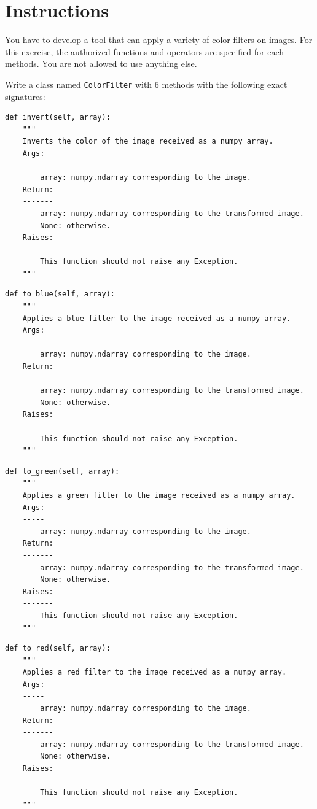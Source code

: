 \documentclass{42-en}
\begin{document}
\section*{Instructions}
You have to develop a tool that can apply a variety of color filters on images.
For this exercise, the authorized functions and operators are specified for each methods.
You are not allowed to use anything else.

Write a class named \texttt{ColorFilter} with 6 methods with the following exact signatures:

\begin{verbatim}
def invert(self, array):
    """
    Inverts the color of the image received as a numpy array.
    Args:
    -----
        array: numpy.ndarray corresponding to the image.
    Return:
    -------
        array: numpy.ndarray corresponding to the transformed image.
        None: otherwise.
    Raises:
    -------
        This function should not raise any Exception.
    """
\end{verbatim}
\begin{verbatim}
def to_blue(self, array):
    """
    Applies a blue filter to the image received as a numpy array.
    Args:
    -----
        array: numpy.ndarray corresponding to the image.
    Return:
    -------
        array: numpy.ndarray corresponding to the transformed image.
        None: otherwise.
    Raises:
    -------
        This function should not raise any Exception.
    """
\end{verbatim}
\begin{verbatim}
def to_green(self, array):
    """
    Applies a green filter to the image received as a numpy array.
    Args:
    -----
        array: numpy.ndarray corresponding to the image.
    Return:
    -------
        array: numpy.ndarray corresponding to the transformed image.
        None: otherwise.
    Raises:
    -------
        This function should not raise any Exception.
    """
\end{verbatim}
\begin{verbatim}
def to_red(self, array):
    """
    Applies a red filter to the image received as a numpy array.
    Args:
    -----
        array: numpy.ndarray corresponding to the image.
    Return:
    -------
        array: numpy.ndarray corresponding to the transformed image.
        None: otherwise.
    Raises:
    -------
        This function should not raise any Exception.
    """
\end{verbatim}
\end{document}

